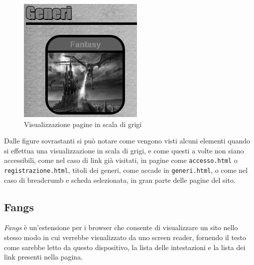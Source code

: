 \begin{figure}[H]
\begin{minipage}{0.45\textwidth}
\end{minipage}
\hspace{\fill}
\begin{minipage}{0.45\textwidth}
\includegraphics[width=\linewidth]{images/bn_h2etitoli.jpg}
\end{minipage}
\caption{Visualizzazione pagine in scala di grigi}\label{multiavp}
\end{figure}

Dalle figure sovrastanti si può notare come vengono visti alcuni elementi
quando si effettua una visualizzazione in scala di grigi, e come questi a
volte non siano accessibili, come nel caso di link già visitati, in pagine
come \texttt{accesso.html} o \texttt{registrazione.html}, titoli dei generi,
come accade in \texttt{generi.html}, o come nel caso di breadcrumb e scheda
selezionata, in gran parte delle pagine del sito.

\subsection{Fangs}\label{sec:fangs} %
\textit{Fangs} è un'estensione per i browser che consente di visualizzare un
sito nello stesso modo in cui verrebbe visualizzato da uno screen reader,
fornendo il testo come sarebbe letto da questo dispositivo, la lista delle
intestazioni e la lista dei link presenti nella pagina.

